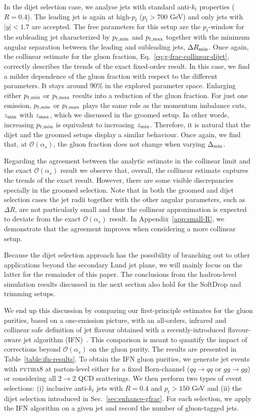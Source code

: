 \documentclass[a4paper,11pt]{article}
\newcommand{\zmin}{z_{\rm{min}}}
\newcommand{\zmax}{z_{\rm{max}}}
\newcommand{\ptmin}{p_{t,\rm{min}}}
\newcommand{\ptmax}{p_{t,\rm{max}}}
\newcommand{\py}{{\textsc{pythia}}8\xspace}
\begin{document}
In the dijet selection case, we analyse jets with standard anti-$k_t$ properties ($R=0.4$). The leading jet is again at high-$p_t$ ($p_t> 700$ GeV) and only jets with $|y|<1.7$ are accepted. The free parameters for this setup are the $p_t$-window for the subleading jet characterized by $\ptmin$ and $\ptmax$ together with the minimum angular separation between the leading and subleading jets, $\Delta R_{\rm min}$. Once again, the collinear estimate for the gluon fraction, Eq.~\eqref{eq:g-frac-collinear-dijet}, correctly describes the trends of the exact fixed-order result. In this case, we find a milder dependence of the gluon fraction with respect to the different parameters. It stays around 90\% in the explored parameter space. Enlarging either $\ptmin$ or $\ptmax$ results into a reduction of the gluon fraction. For just one emission, $\ptmin$ or $\ptmax$ plays the same role as the momentum imbalance cuts, $\zmin$ with $\zmax$, which we discussed in the groomed setup. In other words, increasing $\ptmin$ is equivalent to increasing $\zmin$. Therefore, it is natural that the dijet and the groomed setups display a similar behaviour. Once again, we find that, at $\mathcal{O}(\alpha_s)$, the gluon fraction does not change when varying $\Delta_{\rm min}$.   

Regarding the agreement between the analytic estimate in the collinear limit and the exact $\mathcal{O}(\alpha_s)$ result we observe that, overall, the collinear estimate captures the trends of the exact result. However, there are some visible discrepancies specially in the groomed selection. Note that in both the groomed and dijet selection cases the jet radii together with the other angular parameters, such as $\Delta R$, are not particularly small and thus the collinear approximation is expected to deviate from the exact $\mathcal{O}(\alpha_s)$ result. In Appendix~\ref{app:small-R}, we demonstrate that the agreement improves when considering a more collinear setup.

Because the dijet selection approach has the possibility of branching out to other applications beyond the secondary Lund jet plane, we will mainly focus on the latter for the remainder of this paper. The conclusions from the hadron-level simulation results discussed in the next section also hold for the SoftDrop and trimming setups. 

We end up this discussion by comparing our first-principle estimates
for the gluon purities, based on a one-emission picture, with an
all-orders, infrared and collinear safe definition of jet flavour obtained with a recently-introduced flavour-aware jet algorithm (IFN)~\cite{Caola:2023wpj}. This comparison is meant to quantify the impact of corrections beyond $\mathcal{O}(\alpha_s)$ on the gluon purity. The results are presented in Table~\ref{table:ifn-results}. To obtain the IFN gluon purities, we generate jet events with \py at parton-level either for a fixed Born-channel ($qq\to qq$ or $gg\to gg$) or considering all $2\to 2$ QCD scatterings. We then perform two types of event selections: (i) inclusive anti-$k_t$ jets with $R=0.4$ and $p_t>150$ GeV and (ii) the dijet selection introduced in Sec.~\ref{sec:enhance-gfrac}. For each selection, we apply the IFN algorithm on a given jet and record the number of gluon-tagged jets. 
\end{document}
